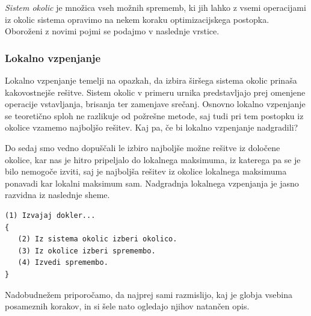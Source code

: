 \documentclass[10pt,a4paper]{article}
\begin{document}
\emph{Sistem okolic} je množica vseh možnih sprememb, ki jih lahko z vsemi operacijami iz
okolic sistema opravimo na nekem koraku optimizacijskega postopka. Oboroženi z novimi pojmi
se podajmo v naslednje vrstice.

\subsubsection{Lokalno vzpenjanje}

Lokalno vzpenjanje temelji na opazkah, da izbira širšega sistema okolic prinaša kakovostnejše
rešitve. Sistem okolic v primeru urnika predstavljajo prej omenjene operacije vstavljanja,
brisanja ter zamenjave srečanj. Osnovno lokalno vzpenjanje se teoretično sploh ne razlikuje
od požrešne metode, saj tudi pri tem postopku iz okolice vzamemo najboljšo rešitev. Kaj pa,
če bi lokalno vzpenjanje nadgradili?

Do sedaj smo vedno dopuščali le izbiro najboljše možne rešitve iz določene okolice, kar nas
je hitro pripeljalo do lokalnega maksimuma, iz katerega pa se je bilo nemogoče izviti, saj
je najboljša rešitev iz okolice lokalnega maksimuma ponavadi kar lokalni maksimum sam.
Nadgradnja lokalnega vzpenjanja je jasno razvidna iz naslednje sheme.

\begin{verbatim}
(1) Izvajaj dokler...
{
   (2) Iz sistema okolic izberi okolico.
   (3) Iz okolice izberi spremembo.
   (4) Izvedi spremembo.
}
\end{verbatim}

\noindent
Nadobudnežem priporočamo, da najprej sami razmislijo, kaj je globja vsebina posameznih
korakov, in si šele nato ogledajo njihov natančen opis.
\end{document}
